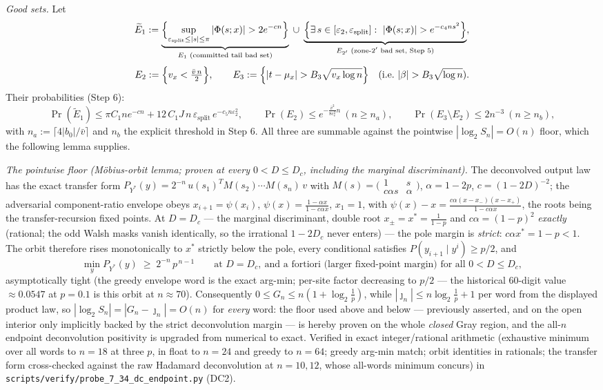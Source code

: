 \documentclass[
]{article}
\begin{document}
\emph{Good sets.}  Let
\[
  \widetilde E_1:=\underbrace{\Bigl\{\sup_{\varepsilon_{\mathrm{split}}
  \le|s|\le\pi}|\Phi(s;x)|>2e^{-cn}\Bigr\}}_{E_1\text{ (committed tail
  bad set)}}
  \;\cup\;
  \underbrace{\Bigl\{\exists\,s\in[\varepsilon_2,
  \varepsilon_{\mathrm{split}}]:\ |\Phi(s;x)|>e^{-c_4 n s^2}
  \Bigr\}}_{E_{2'}\text{ (zone-$2'$ bad set, Step 5)}},
\]
\[
  E_2:=\Bigl\{v_x<\tfrac{\bar v\,n}{2}\Bigr\},\qquad
  E_3:=\Bigl\{|t-\mu_x|>B_3\sqrt{v_x\log n}\Bigr\}
  \quad(\text{i.e.\ }|\beta|>B_3\sqrt{\log n}) .
\]
Their probabilities (Step 6):
\[
  \tag{P}
  \Pr(\widetilde E_1)\le\pi C_1ne^{-cn}
  +12\,C_1 J\,n\,\varepsilon_{\mathrm{split}}\,
  e^{-c_5 n\varepsilon_2^2},
  \qquad
  \Pr(E_2)\le e^{-\frac{\bar v^2}{8c_v^2}n}\ (n\ge n_a),
  \qquad
  \Pr(E_3\setminus E_2)\le2n^{-3}\ (n\ge n_b),
\]
with $n_a:=\lceil4|b_0|/\bar v\rceil$ and $n_b$ the explicit threshold
in Step 6.  All three are summable against the pointwise
$|\log_2 S_n|=O(n)$ floor, which the following lemma supplies.

\emph{The pointwise floor (M\"obius-orbit lemma; proven at every $0<D\le D_c$, including the marginal
discriminant).} The deconvolved output law has the exact transfer form
$P_{Y^*}(y)=2^{-n}\,u(s_1)^TM(s_2)\cdots M(s_n)\,v$ with
$M(s)=\bigl(\begin{smallmatrix}1&s\\ c\alpha s&\alpha\end{smallmatrix}\bigr)$, $\alpha=1-2p$,
$c=(1-2D)^{-2}$; the adversarial component-ratio envelope obeys $x_{i+1}=\psi(x_i)$,
$\psi(x)=\tfrac{1-\alpha x}{1-c\alpha x}$, $x_1=1$, with
$\psi(x)-x=\tfrac{c\alpha(x-x_-)(x-x_+)}{1-c\alpha x}$, the roots being the transfer-recursion fixed
points. At $D=D_c$ --- the marginal discriminant, double root $x_\pm=x^*=\tfrac1{1-p}$ and
$c\alpha=(1-p)^2$ \emph{exactly} (rational; the odd Walsh masks vanish identically, so the irrational
$1-2D_c$ never enters) --- the pole margin is \emph{strict}: $c\alpha x^*=1-p<1$. The orbit therefore
rises monotonically to $x^*$ strictly below the pole, every conditional satisfies
$P(y_{i+1}\mid y^i)\ge p/2$, and
\[
  \min_y P_{Y^*}(y)\;\ge\;2^{-n}\,p^{\,n-1}
  \qquad\text{at }D=D_c,\ \text{and a fortiori (larger fixed-point margin) for all }0<D\le D_c,
\]
asymptotically tight (the greedy envelope word is the exact arg-min; per-site factor decreasing to
$p/2$ --- the historical $60$-digit value $\approx0.0547$ at $p=0.1$ is this orbit at $n\approx70$).
Consequently $0\le G_n\le n(1+\log_2\tfrac1p)$, while $|\jmath_n|\le n\log_2\tfrac1p+1$ per word from
the displayed product law, so $|\log_2 S_n|=|G_n-\jmath_n|=O(n)$ for \emph{every}
word: the floor used above and below --- previously asserted, and on the open interior only implicitly
backed by the strict deconvolution margin --- is hereby proven on the whole \emph{closed} Gray region,
and the all-$n$ endpoint deconvolution positivity is upgraded from numerical to exact. Verified in
exact integer/rational arithmetic (exhaustive minimum over all words to $n=18$ at three $p$, in float
to $n=24$ and greedy to $n=64$; greedy arg-min match; orbit identities in rationals; the transfer form
cross-checked against the raw Hadamard deconvolution at $n=10,12$, whose all-words minimum concurs) in
\texttt{scripts/verify/probe\_7\_34\_dc\_endpoint.py} (DC2).
\end{document}
